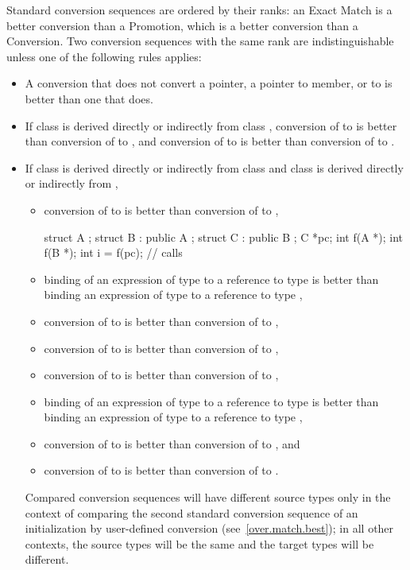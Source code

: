 \pnum
Standard conversion sequences are ordered by their ranks: an Exact Match is a
better conversion than a Promotion, which is a better conversion than
a Conversion.
Two conversion sequences with the same rank are indistinguishable unless
one of the following rules applies:

\begin{itemize}
\item
A conversion that does not convert a pointer,
a pointer to member, or 
to
is better than one that does.
\item
If class
is derived directly or indirectly from class
,
conversion of
to
is better than conversion of
to
,
and conversion of
to
is better than conversion
of
to
.
\item
If class
is derived directly or indirectly from class
and class
is derived directly or indirectly from
,

\begin{itemize}
\item
conversion of
to
is better than conversion of
to
,
\enterexample

\begin{codeblock}
struct A {};
struct B : public A {};
struct C : public B {};
C *pc;
int f(A *);
int f(B *);
int i = f(pc);                  // calls 
\end{codeblock}
\exitexample

\item
binding of an expression of type
to a reference to type
is better than binding an expression of type
to a reference to type
,
\item
conversion of
to
is better than conversion of
to
,
\item
conversion of
to
is better than conversion of
to
,
\item
conversion of
to
is better than conversion of
to
,
\item
binding of an expression of type
to a reference to type
is better than binding an expression of type
to a
reference to type
,
\item
conversion of
to
is better than conversion
of
to
,
and
\item
conversion of
to
is better than conversion of
to
.
\end{itemize}

\enternote
Compared conversion sequences will have different source types only in the
context of comparing the second standard conversion sequence of an
initialization by user-defined conversion (see~\ref{over.match.best}); in
all other contexts, the source types will be the same and the target
types will be different.
\exitnote
\end{itemize}%

